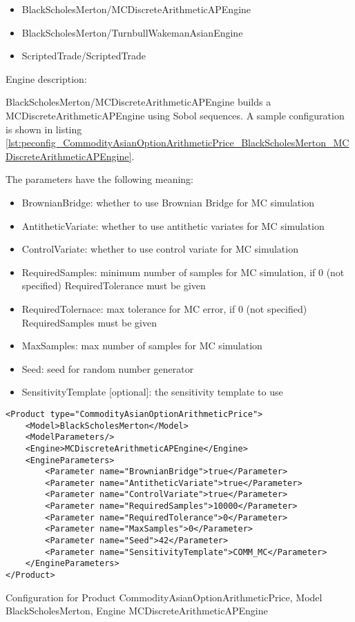 \begin{itemize}
  \item BlackScholesMerton/MCDiscreteArithmeticAPEngine
  \item BlackScholesMerton/TurnbullWakemanAsianEngine
  \item ScriptedTrade/ScriptedTrade
\end{itemize}

Engine description:

BlackScholesMerton/MCDiscreteArithmeticAPEngine builds a MCDiscreteArithmeticAPEngine using Sobol sequences. A sample
configuration is shown in listing
\ref{lst:peconfig_CommodityAsianOptionArithmeticPrice_BlackScholesMerton_MCDiscreteArithmeticAPEngine}.

The parameters have the following meaning:

\begin{itemize}
\item BrownianBridge: whether to use Brownian Bridge for MC simulation
\item AntitheticVariate: whether to use antithetic variates for MC simulation
\item ControlVariate: whether to use control variate for MC simulation
\item RequiredSamples: minimum number of samples for MC simulation, if 0 (not specified) RequiredTolerance must be given
\item RequiredTolernace: max tolerance for MC error, if 0 (not specified) RequiredSamples must be given
\item MaxSamples: max number of samples for MC simulation
\item Seed: seed for random number generator
\item SensitivityTemplate [optional]: the sensitivity template to use 
\end{itemize}

\begin{longlisting}
\begin{verbatim}
<Product type="CommodityAsianOptionArithmeticPrice">
    <Model>BlackScholesMerton</Model>
    <ModelParameters/>
    <Engine>MCDiscreteArithmeticAPEngine</Engine>
    <EngineParameters>
        <Parameter name="BrownianBridge">true</Parameter>    
        <Parameter name="AntitheticVariate">true</Parameter>    
        <Parameter name="ControlVariate">true</Parameter>    
        <Parameter name="RequiredSamples">10000</Parameter>    
        <Parameter name="RequiredTolerance">0</Parameter>    
        <Parameter name="MaxSamples">0</Parameter>    
        <Parameter name="Seed">42</Parameter>    
        <Parameter name="SensitivityTemplate">COMM_MC</Parameter>
    </EngineParameters>
</Product>
\end{verbatim}
\caption{Configuration for Product CommodityAsianOptionArithmeticPrice, Model BlackScholesMerton, Engine MCDiscreteArithmeticAPEngine}
\label{lst:peconfig_CommodityAsianOptionArithmeticPrice_BlackScholesMerton_MCDiscreteArithmeticAPEngine}
\end{longlisting}

